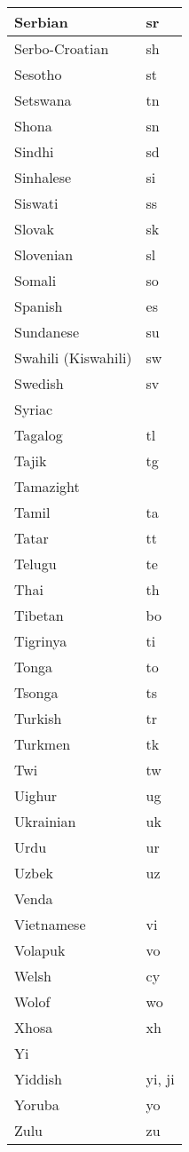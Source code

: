 \begin{longtable}{|l|l|}
\hline
Serbian				&sr\\
\hline
Serbo-Croatian		&	sh\\
\hline
Sesotho				&st\\
\hline
Setswana			&	tn\\
\hline
Shona				&sn\\
\hline
Sindhi				&sd\\
\hline
Sinhalese				&si\\
\hline
Siswati				&ss\\
\hline
Slovak				&sk\\
\hline
Slovenian				&sl \\
\hline
Somali				&so\\
\hline
Spanish				&es\\
\hline
Sundanese			&	su\\
\hline
Swahili (Kiswahili)		&	sw\\
\hline
Swedish				&sv\\
\hline
Syriac				& \\
\hline
Tagalog				&tl\\
\hline
Tajik					&tg\\
\hline
Tamazight			& \\
\hline
Tamil				&ta\\
\hline
Tatar				&tt\\
\hline
Telugu				&te\\
\hline
Thai					&th\\
\hline
Tibetan				&bo\\
\hline
Tigrinya				&ti\\
\hline
Tonga				&to\\
\hline
Tsonga				&ts\\
\hline
Turkish				&tr\\
\hline
Turkmen				&tk\\
\hline
Twi					&tw\\
\hline
Uighur				&		ug\\
\hline
Ukrainian				&uk\\
\hline
Urdu				&ur\\
\hline
Uzbek				&uz\\
\hline
Venda				& \\
\hline
Vietnamese			&vi\\
\hline
Volapuk				&vo\\
\hline
Welsh				&cy\\
\hline
Wolof				&wo\\
\hline
Xhosa				&xh\\
\hline
Yi	 				&\\
\hline
Yiddish				&yi, ji\\
\hline
Yoruba				&yo\\
\hline
Zulu					&zu\\
\hline
\end{longtable}





















